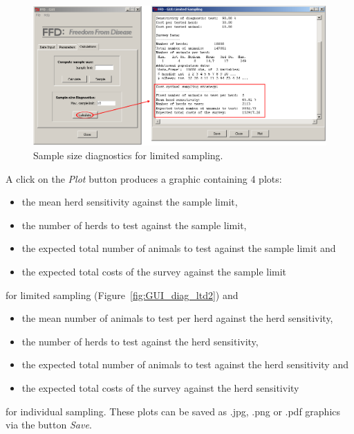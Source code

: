 \documentclass[nojss]{jss}
\begin{document}
\begin{figure}[h!t]
\begin{center}
\includegraphics[width=120mm]{GUI_diag_ltd1.png}
\end{center}
\caption{Sample size diagnostics for limited sampling.} \label{fig:GUI_diag_ltd1}
\end{figure}

A click on the \emph{Plot} button produces a graphic containing 4 plots:
%
\begin{itemize}
\item the mean herd sensitivity against the sample limit,
\item the number of herds to test against the sample limit,
\item the expected total number of animals to test against the sample limit and
\item the expected total costs of the survey against the sample limit
\end{itemize}
%
for limited sampling (Figure~\ref{fig:GUI_diag_ltd2}) and
%
\begin{itemize}
\item the mean number of animals to test per herd against the herd sensitivity,
\item the number of herds to test against the herd sensitivity,
\item the expected total number of animals to test against the herd sensitivity and
\item the expected total costs of the survey against the herd sensitivity
\end{itemize}
%
for individual sampling. These plots can be saved as .jpg, .png or .pdf graphics via the button \emph{Save}.
\end{document}
